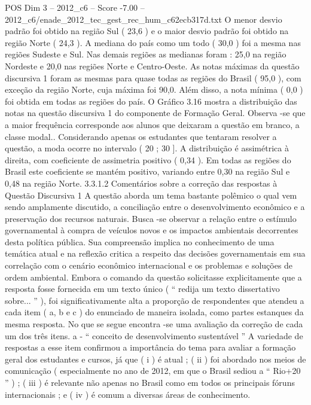\begin{textsample}{POS Dim 3 – 2012\_c6 – Score -7.00 – 2012\_c6/enade\_2012\_tec\_gest\_rec\_hum\_c62ecb317d.txt}
O menor desvio padrão foi obtido na região Sul ( 23,6 ) e o maior desvio padrão foi obtido na região Norte ( 24,3 ).
A mediana do país como um todo ( 30,0 ) foi a mesma nas regiões Sudeste e Sul.
Nas demais regiões as medianas foram : 25,0 na região Nordeste e 20,0 nas regiões Norte e Centro-Oeste.
As notas máximas da questão discursiva 1 foram as mesmas para quase todas as regiões do Brasil ( 95,0 ), com exceção da região Norte, cuja máxima foi 90,0.
Além disso, a nota mínima ( 0,0 ) foi obtida em todas as regiões do país.
O Gráfico 3.16 mostra a distribuição das notas na questão discursiva 1 do componente de Formação Geral.
Observa -se que a maior frequência corresponde aos alunos que deixaram a questão em branco, a classe modal..
Considerando apenas os estudantes que tentaram resolver a questão, a moda ocorre no intervalo ( 20 ; 30 ].
A distribuição é assimétrica à direita, com coeficiente de assimetria positivo ( 0,34 ).
Em todas as regiões do Brasil este coeficiente se mantém positivo, variando entre 0,30 na região Sul e 0,48 na região Norte. 3.3.1.2 Comentários sobre a correção das respostas à Questão Discursiva 1 A questão aborda um tema bastante polêmico o qual vem sendo amplamente discutido, a conciliação entre o desenvolvimento econômico e a preservação dos recursos naturais.
Busca -se observar a relação entre o estímulo governamental à compra de veículos novos e os impactos ambientais decorrentes desta política pública.
Sua compreensão implica no conhecimento de uma temática atual e na reflexão critica a respeito das decisões governamentais em sua correlação com o cenário econômico internacional e os problemas e soluções de ordem ambiental.
Embora o comando da questão solicitasse explicitamente que a resposta fosse fornecida em um texto único ( “ redija um texto dissertativo sobre... ” ), foi significativamente alta a proporção de respondentes que atendeu a cada item ( a, b e c ) do enunciado de maneira isolada, como partes estanques da mesma resposta.
No que se segue encontra -se uma avaliação da correção de cada um dos três itens. a - “ conceito de desenvolvimento sustentável ” A variedade de respostas a esse item confirmou a importância do tema para avaliar a formação geral dos estudantes e cursos, já que ( i ) é atual ; ( ii ) foi abordado nos meios de comunicação ( especialmente no ano de 2012, em que o Brasil sediou a “ Rio+20 ” ) ; ( iii ) é relevante não apenas no Brasil como em todos os principais fóruns internacionais ; e ( iv ) é comum a diversas áreas de conhecimento.

\end{textsample}
